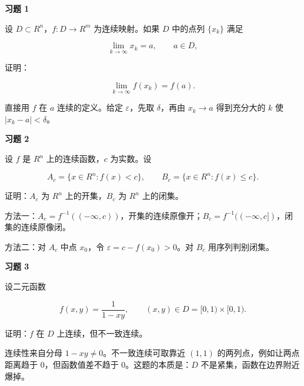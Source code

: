 \begin{exercisebox}
\textbf{习题 1}

设 \(D\subset R^n\)，\(f:D\to R^m\) 为连续映射。如果 \(D\) 中的点列 \(\{x_k\}\) 满足

\[
        \lim_{k\to\infty}x_k=a,\qquad a\in D,
      \]

证明：

\[
        \lim_{k\to\infty}f(x_k)=f(a).
      \]

\begin{hintbox}
直接用 \(f\) 在 \(a\) 连续的定义。给定 \(\varepsilon\)，先取 \(\delta\)，再由 \(x_k\to a\) 得到充分大的 \(k\) 使 \(|x_k-a|<\delta\)。
\end{hintbox}
\end{exercisebox}

\begin{exercisebox}
\textbf{习题 2}

设 \(f\) 是 \(R^n\) 上的连续函数，\(c\) 为实数。设

\[
        A_c=\{x\in R^n:f(x)< c\},\qquad
        B_c=\{x\in R^n:f(x)\le c\}.
      \]

证明：\(A_c\) 为 \(R^n\) 上的开集，\(B_c\) 为 \(R^n\) 上的闭集。

\begin{hintbox}
方法一：\(A_c=f^{-1}((-\infty,c))\)，开集的连续原像开；\(B_c=f^{-1}((-\infty,c])\)，闭集的连续原像闭。

方法二：对 \(A_c\) 中点 \(x_0\)，令 \(\varepsilon=c-f(x_0)>0\)。对 \(B_c\) 用序列判别闭集。
\end{hintbox}
\end{exercisebox}

\begin{exercisebox}
\textbf{习题 3}

设二元函数

\[
        f(x,y)=\frac{1}{1-xy},\qquad (x,y)\in D=[0,1)\times[0,1).
      \]

证明：\(f\) 在 \(D\) 上连续，但不一致连续。

\begin{hintbox}
连续性来自分母 \(1-xy\ne0\)。不一致连续可取靠近 \((1,1)\) 的两列点，例如让两点距离趋于 \(0\)，但函数值差不趋于 \(0\)。这题的本质是：\(D\) 不是紧集，函数在边界附近爆掉。
\end{hintbox}
\end{exercisebox}

